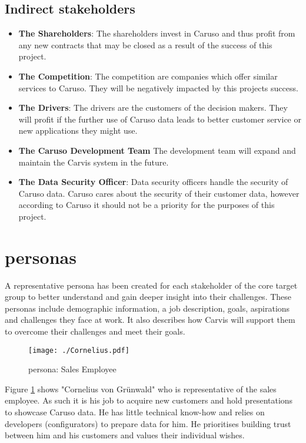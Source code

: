 \subsection{Indirect \Glspl{stakeholder}}
\begin{itemize}
  \item \textbf{The Shareholders}: The shareholders invest in Caruso and thus profit from any new contracts that may be closed as a result of the success of this project.
  \item \textbf{The Competition}: The competition are companies which offer similar services to Caruso. They will be negatively impacted by this projects success.
  \item \textbf{The Drivers}: The drivers are the customers of the decision makers. They will profit if the further use of Caruso data leads to better customer service or new applications they might use.
  \item \textbf{The Caruso Development Team} The development team will expand and maintain the Carvis system in the future.
  \item \textbf{The Data Security Officer}: Data security officers handle the security of Caruso data. Caruso cares about the security of their customer data, however according to Caruso it should not be a priority for the purposes of this project.
\end{itemize}

\section{\Glspl{persona}}
A representative \gls{persona} has been created for each \gls{stakeholder} of the core target group to better understand and gain deeper insight into their challenges. These \glspl{persona} include demographic information, a job description, goals, aspirations and challenges they face at work. It also describes how Carvis will support them to overcome their challenges and meet their goals.

\begin{figure}[ht]
  \centering
  \texttt{[image: ./Cornelius.pdf]}
  \caption{\Gls{persona}: Sales Employee }
  \label{Persona:Cornelius}
\end{figure}
Figure \ref{Persona:Cornelius} shows "Cornelius von Grünwald" who is representative of the sales employee. As such it is his job to acquire new customers and hold presentations to showcase Caruso data. He has little technical know-how and relies on developers (configurators) to prepare data for him. He prioritises building trust between him and his customers and values their individual wishes.

